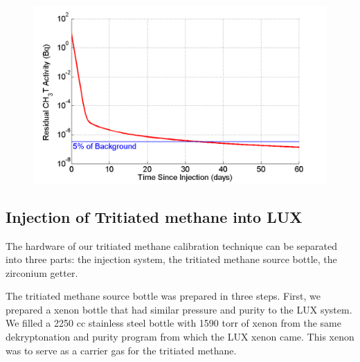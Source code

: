 \begin{figure}
\includegraphics[scale=.4]{OutgassingSim.png} 
\label{OutgassingSim}
\end{figure}


\subsection{Injection of Tritiated methane into LUX}

The hardware of our tritiated methane calibration technique can be separated into three parts: the injection system, the tritiated methane source bottle, the zirconium getter.

The tritiated methane source bottle was prepared in three steps. First, we prepared a xenon bottle that had similar pressure and purity to the LUX system. We filled a 2250 cc stainless steel bottle with 1590 torr of xenon from the same dekryptonation and purity program from which the LUX xenon came. This xenon was to serve as a carrier gas for the tritiated methane. 


